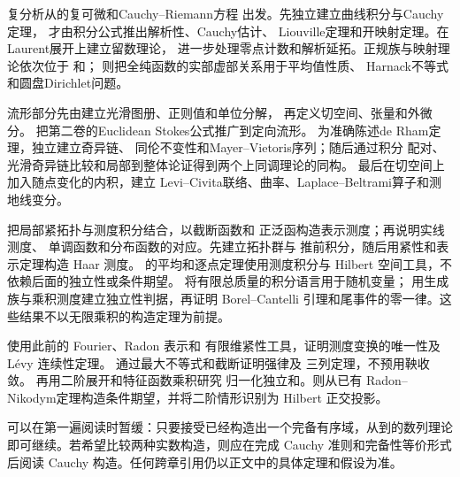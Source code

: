 复分析从的复可微和Cauchy--Riemann方程
出发。先独立建立曲线积分与Cauchy定理，
才由积分公式推出解析性、Cauchy估计、
Liouville定理和开映射定理。在
Laurent展开上建立留数理论，
进一步处理零点计数和解析延拓。正规族与映射理论依次位于
和；
则把全纯函数的实部虚部关系用于平均值性质、
Harnack不等式和圆盘Dirichlet问题。

流形部分先由建立光滑图册、正则值和单位分解，
再定义切空间、张量和外微分。
把第二卷的Euclidean Stokes公式推广到定向流形。
为准确陈述de Rham定理，独立建立奇异链、
同伦不变性和Mayer--Vietoris序列；随后通过积分
配对、光滑奇异链比较和局部到整体论证得到两个上同调理论的同构。
最后在切空间上加入随点变化的内积，建立
Levi--Civita联络、曲率、Laplace--Beltrami算子和测地线变分。

把局部紧拓扑与测度积分结合，以截断函数和
正泛函构造表示测度；再说明实线测度、
单调函数和分布函数的对应。先建立拓扑群与
推前积分，随后用紧性和表示定理构造 Haar 测度。
的平均和逐点定理使用测度积分与 Hilbert
空间工具，不依赖后面的独立性或条件期望。
将有限总质量的积分语言用于随机变量；
用生成族与乘积测度建立独立性判据，再证明
Borel--Cantelli 引理和尾事件的零一律。这些结果不以无限乘积的构造定理为前提。

使用此前的 Fourier、Radon 表示和
有限维紧性工具，证明测度变换的唯一性及 Lévy 连续性定理。
通过最大不等式和截断证明强律及
三列定理，不预用鞅收敛。
再用二阶展开和特征函数乘积研究
归一化独立和。则从已有
Radon--Nikodym定理构造条件期望，并将二阶情形识别为 Hilbert 正交投影。

可以在第一遍阅读时暂缓：只要接受已经构造出一个完备有序域，从到的数列理论即可继续。若希望比较两种实数构造，则应在完成 Cauchy 准则和完备性等价形式后阅读 Cauchy 构造。任何跨章引用仍以正文中的具体定理和假设为准。
